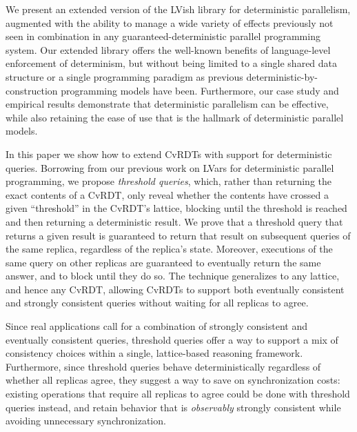 
We present an extended version of the LVish library for deterministic
 parallelism, augmented with the ability to manage a wide variety of
 effects previously not seen in combination in any
 guaranteed-deterministic parallel programming system.
 Our extended library offers the
well-known benefits of language-level enforcement of determinism, but
without being limited to a single shared data structure or a single
programming paradigm as previous deterministic-by-construction
programming models have been.  
Furthermore, our case study and empirical results demonstrate that
deterministic parallelism can be effective, while also
retaining the ease of use that is the
hallmark of deterministic parallel models.


In this paper we show how to extend CvRDTs with support for
deterministic queries.  Borrowing from our previous work on LVars for
deterministic parallel programming, we propose \emph{threshold
  queries}, which, rather than returning the exact contents of a
CvRDT, only reveal whether the contents have crossed a given
``threshold'' in the CvRDT's lattice, blocking until the threshold is
reached and then returning a deterministic result.  We prove that a
threshold query that returns a given result is guaranteed to return
that result on subsequent queries of the same replica, regardless of
the replica's state.  Moreover, executions of the same query on other
replicas are guaranteed to eventually return the same answer, and to
block until they do so.  The technique generalizes to any lattice, and
hence any CvRDT, allowing CvRDTs to support both eventually consistent
and strongly consistent queries without waiting for all replicas to
agree.

Since real applications call for a combination of strongly consistent
and eventually consistent queries, threshold queries offer a way to
support a mix of consistency choices within a single, lattice-based
reasoning framework.  Furthermore, since threshold queries behave
deterministically regardless of whether all replicas agree, they
suggest a way to save on synchronization costs: existing operations
that require all replicas to agree could be done with threshold
queries instead, and retain behavior that is \emph{observably}
strongly consistent while avoiding unnecessary synchronization.
